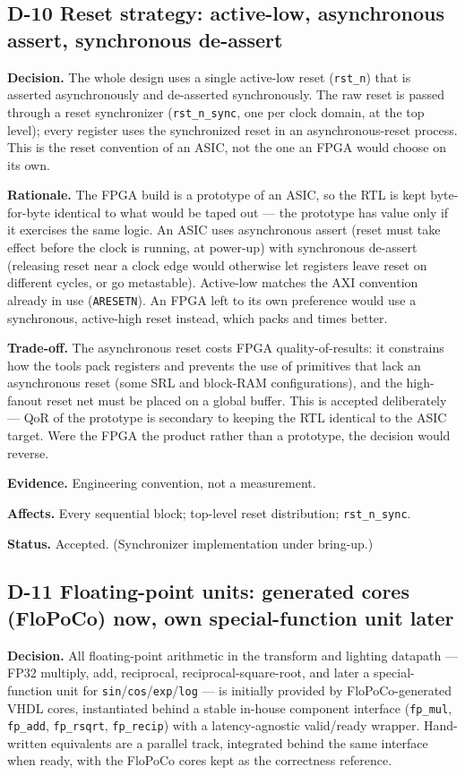 \documentclass[11pt,a4paper]{article}
\newcommand{\field}[1]{\textbf{#1}\quad}
\begin{document}
\subsection{D-10 \quad Reset strategy: active-low, asynchronous assert,
synchronous de-assert}
\field{Decision.} The whole design uses a single active-low reset
(\texttt{rst\_n}) that is asserted asynchronously and de-asserted synchronously.
The raw reset is passed through a reset synchronizer (\texttt{rst\_n\_sync}, one
per clock domain, at the top level); every register uses the synchronized reset
in an asynchronous-reset process. This is the reset convention of an ASIC, not
the one an FPGA would choose on its own.

\field{Rationale.} The FPGA build is a prototype of an ASIC, so the RTL is kept
byte-for-byte identical to what would be taped out --- the prototype has value
only if it exercises the same logic. An ASIC uses asynchronous assert (reset
must take effect before the clock is running, at power-up) with synchronous
de-assert (releasing reset near a clock edge would otherwise let registers leave
reset on different cycles, or go metastable). Active-low matches the AXI
convention already in use (\texttt{ARESETN}). An FPGA left to its own preference
would use a synchronous, active-high reset instead, which packs and times
better.

\field{Trade-off.} The asynchronous reset costs FPGA quality-of-results: it
constrains how the tools pack registers and prevents the use of primitives that
lack an asynchronous reset (some SRL and block-RAM configurations), and the
high-fanout reset net must be placed on a global buffer. This is accepted
deliberately --- QoR of the prototype is secondary to keeping the RTL identical
to the ASIC target. Were the FPGA the product rather than a prototype, the
decision would reverse.

\field{Evidence.} Engineering convention, not a measurement.

\field{Affects.} Every sequential block; top-level reset distribution;
\texttt{rst\_n\_sync}.

\field{Status.} Accepted. (Synchronizer implementation under bring-up.)

\subsection{D-11 \quad Floating-point units: generated cores (FloPoCo) now,
own special-function unit later}
\field{Decision.} All floating-point arithmetic in the transform and lighting
datapath --- FP32 multiply, add, reciprocal, reciprocal-square-root, and later a
special-function unit for \texttt{sin}/\texttt{cos}/\texttt{exp}/\texttt{log}
--- is initially provided by FloPoCo-generated VHDL cores, instantiated behind a
stable in-house component interface (\texttt{fp\_mul}, \texttt{fp\_add},
\texttt{fp\_rsqrt}, \texttt{fp\_recip}) with a latency-agnostic valid/ready
wrapper. Hand-written equivalents are a parallel track, integrated behind the
same interface when ready, with the FloPoCo cores kept as the correctness
reference.
\end{document}
